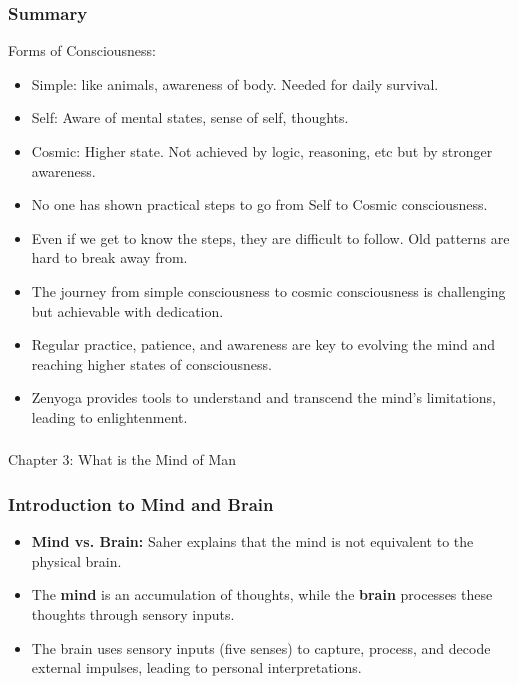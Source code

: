 \begin{frame}[fragile]\frametitle{Summary}
Forms of Consciousness:
\begin{itemize}
\item Simple: like animals, awareness of body. Needed for daily survival.
\item Self: Aware of mental states, sense of self, thoughts.
\item Cosmic: Higher state. Not achieved by logic, reasoning, etc but by stronger awareness.
\item No one has shown practical steps to go from Self to Cosmic consciousness.
\item Even if we get to know the steps, they are difficult to follow. Old patterns are hard to break away from.
\item The journey from simple consciousness to cosmic consciousness is challenging but achievable with dedication.
\item Regular practice, patience, and awareness are key to evolving the mind and reaching higher states of consciousness.
\item Zenyoga provides tools to understand and transcend the mind's limitations, leading to enlightenment.
\end{itemize}


\end{frame}


\begin{frame}[fragile]\frametitle{}
\begin{center}
{\Large Chapter 3: What is the Mind of Man}
\end{center}
\end{frame}

\begin{frame}[fragile]\frametitle{Introduction to Mind and Brain}
\begin{itemize}
    \item \textbf{Mind vs. Brain:} Saher explains that the mind is not equivalent to the physical brain.
    \item The \textbf{mind} is an accumulation of thoughts, while the \textbf{brain} processes these thoughts through sensory inputs.
    \item The brain uses sensory inputs (five senses) to capture, process, and decode external impulses, leading to personal interpretations.
\end{itemize}
\end{frame}


